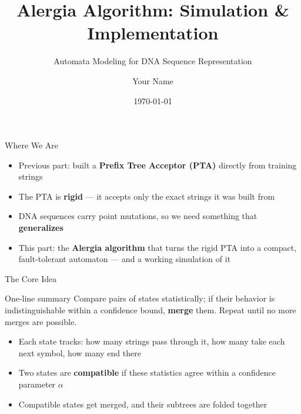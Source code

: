 \documentclass[aspectratio=169]{beamer}
\title{Alergia Algorithm: Simulation \& Implementation}
\subtitle{Automata Modeling for DNA Sequence Representation}
\author{Your Name}
\institute{BUET}
\date{\today}
\begin{document}
\begin{frame}
  \titlepage
\end{frame}

\begin{frame}{Where We Are}
  \begin{itemize}
    \item Previous part: built a \textbf{Prefix Tree Acceptor (PTA)} directly
          from training strings
    \item The PTA is \textbf{rigid} --- it accepts only the exact strings it
          was built from
    \item DNA sequences carry point mutations, so we need something that
          \textbf{generalizes}
    \item This part: the \textbf{Alergia algorithm} that turns the rigid PTA
          into a compact, fault-tolerant automaton --- and a working
          simulation of it
  \end{itemize}
\end{frame}

\begin{frame}{The Core Idea}
  \begin{block}{One-line summary}
    Compare pairs of states statistically; if their behavior is
    indistinguishable within a confidence bound, \textbf{merge} them.
    Repeat until no more merges are possible.
  \end{block}
  \vspace{0.5cm}
  \begin{itemize}
    \item Each state tracks: how many strings pass through it, how many
          take each next symbol, how many end there
    \item Two states are \textbf{compatible} if these statistics agree
          within a confidence parameter $\alpha$
    \item Compatible states get merged, and their subtrees are folded
          together
  \end{itemize}
\end{frame}
\end{document}
